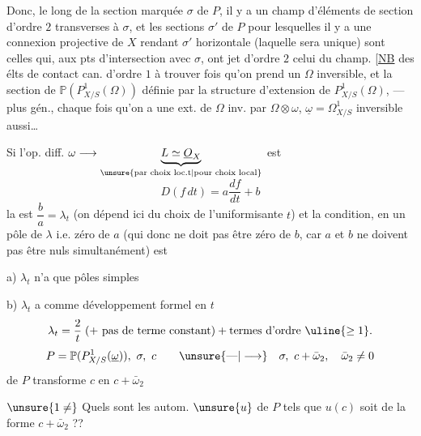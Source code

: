 Donc, le long de la section marquée $\sigma$ de $P$, il y a un champ d'éléments de section d'ordre $2$ transverses à $\sigma$, et les sections $\sigma'$ de $P$  pour lesquelles il y a une connexion projective de $X$ rendant $\sigma'$ horizontale (laquelle sera unique) sont celles qui, aux pts d'intersection avec $\sigma$, ont  jet d'ordre $2$ celui du champ. [\uline{NB} des élts de contact can. d'ordre $1$ à trouver  fois qu'on prend un $\Omega$ inversible, et la section de $\mathbb{P}(P^1_{X/S}(\Omega))$ définie par la
structure d'extension de $P^1_{X/S}(\Omega)$, --- plus gén., chaque fois qu'on a une ext. de $\Omega$ inv. par $\Omega\otimes\omega$, $\underline{\omega}=\Omega^1_{X/S}$ inversible aussi\ldots

Si l'op. diff. $\omega\longrightarrow\underbrace{L\simeq\underline{O}_X}_{\unsure{\text{par choix loc.t}|\text{pour choix local}}}$ est
\[
D(f\,dt)=a\frac{df}{dt}+b
\]
la  est $\dfrac ba=\lambda_t$
(on dépend ici du choix de l'uniformisante $t$)
et la condition, en un pôle de $\lambda$ i.e. zéro de $a$
(qui donc ne doit pas être zéro de $b$, car $a$ et $b$ ne doivent pas être nuls simultanément) est

\noindent a) $\lambda_t$  n'a que pôles simples

\noindent b) \deleted{$\unsure{\beta}$} $\lambda_t$ a comme développement formel en $t$
\[
\lambda_t=\frac{2}{t}\;(+\text{ pas de terme constant})+\text{termes d'ordre }\uline{\geq1}.
\]
\[
P=\mathbb P(P^1_{X/S}(\underline\omega)),\ \sigma,\ c
\qquad\unsure{\text{---}|\longrightarrow}\quad\sigma,\ c+\bar\omega_2,\quad\bar\omega_2\ne0
\]
 de $P$ transforme $c$ en $c+\bar\omega_2$

 \uline{} $\unsure{1\ne}$ 
Quels sont les autom. $\unsure{u}$ de $P$ tels que $u(c)$ soit de la forme $c+\bar\omega_2$ ??

\margin{$\unsure{\omega}$}

